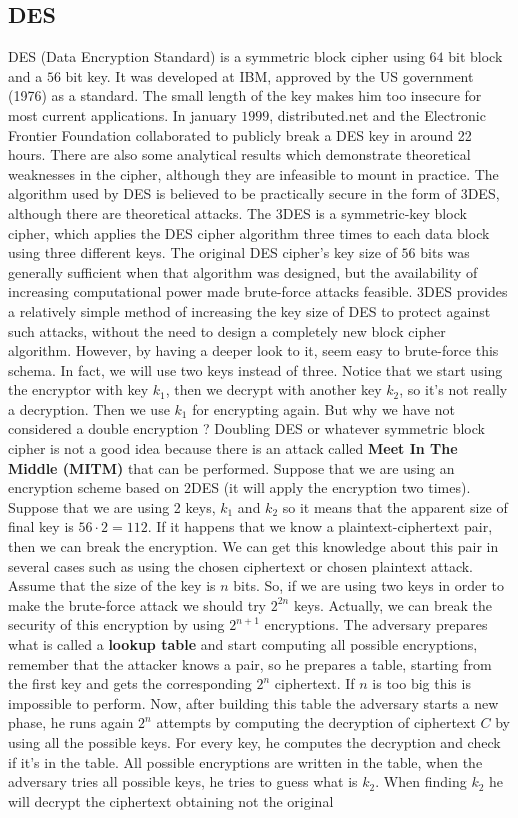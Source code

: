 \documentclass[11pt]{article}
\begin{document}
\subsection{DES}
DES (Data Encryption Standard) is a symmetric block cipher using $64$ bit block and a $56$ bit key. It was developed at IBM, approved by the US government (1976) as a standard. The small length of the key makes him too insecure for most current applications. In january $1999$, distributed.net and the Electronic Frontier Foundation collaborated to publicly break a DES key in around 22 hours. There are also some analytical results which demonstrate theoretical weaknesses in the cipher, although they are infeasible to mount in practice. The algorithm used by DES is believed to be practically secure in the form of 3DES, although there are theoretical attacks. The 3DES is a symmetric-key block cipher, which applies the DES cipher algorithm three times to each data block using three different keys. The original DES cipher's key size of $56$ bits was generally sufficient when that algorithm was designed, but the availability of increasing computational power made brute-force attacks feasible. 3DES provides a relatively simple method of increasing the key size of DES to protect against such attacks, without the need to design a completely new block cipher algorithm. However, by having a deeper look to it, seem easy to brute-force this schema. In fact, we will use two keys instead of three. Notice that we start using the encryptor with key $k_1$, then we decrypt with another key $k_2$, so it's not really a decryption. Then we use $k_1$ for encrypting again. But why we have not considered a double encryption ? Doubling DES or whatever symmetric block cipher is not a good idea because there is an attack called \textbf{Meet In The Middle (MITM)} that can be performed. Suppose that we are using an encryption scheme based on 2DES (it will apply the encryption two times). Suppose  that we are using 2 keys, $k_1$ and $k_2$ so it means that the apparent size of final key is $56 \cdot 2 = 112$. If it happens that we know a plaintext-ciphertext pair, then we can break the encryption. We can get this knowledge about this pair in several cases such as using the chosen ciphertext or chosen plaintext attack. Assume that the size of the key is $n$ bits. So, if we are using two keys in order to make the brute-force attack we should try $2^{2n}$ keys. Actually, we can break the security of this encryption by using $2^{n + 1}$ encryptions. The adversary prepares what is called a \textbf{lookup table} and start computing all possible encryptions, remember that the attacker knows a pair, so he prepares a table, starting from the first key and gets the corresponding $2^n$ ciphertext. If $n$ is too big this is impossible to perform. Now, after building this table the adversary starts a new phase, he runs again $2^n$ attempts by computing the decryption of ciphertext $C$ by using all the possible keys. For every key, he computes the decryption and check if it's in the table. All possible encryptions are written in the table, when the adversary tries all possible keys, he tries to guess what is $k_2$. When finding $k_2$ he will decrypt the ciphertext obtaining not the original 
\end{document}
